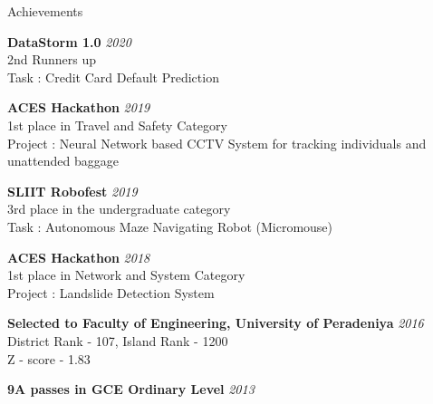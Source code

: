 \documentclass{resume} %
\begin{document}

\begin{rSection}{Achievements}

{\bf DataStorm 1.0} \hfill {\em 2020}
\\2nd Runners up
\\Task : Credit Card Default Prediction


{\bf ACES Hackathon} \hfill {\em 2019}
\\1st place in Travel and Safety Category
\\Project : Neural Network based CCTV System for tracking individuals and unattended baggage

{\bf SLIIT Robofest} \hfill {\em 2019}
\\3rd place in the undergraduate category
\\Task : Autonomous Maze Navigating Robot (Micromouse)

{\bf ACES Hackathon} \hfill {\em 2018}
\\1st place in Network and System Category
\\Project : Landslide Detection System

{\bf Selected to Faculty of Engineering, University of Peradeniya} \hfill {\em 2016}
\\District Rank - 107,  Island Rank - 1200
\\Z - score - 1.83

{\bf 9A passes in GCE Ordinary Level} \hfill {\em 2013} 
\end{rSection}

\end{document}
